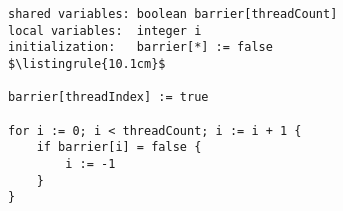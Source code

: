 \begin{minipage}
\centering
\begin{lstlisting}[mathescape, linewidth=10.1cm]
shared variables: boolean barrier[threadCount]
local variables:  integer i
initialization:   barrier[*] := false
$\listingrule{10.1cm}$

barrier[threadIndex] := true

for i := 0; i < threadCount; i := i + 1 {
	if barrier[i] = false {
		i := -1
	}
}
\end{lstlisting}
\end{minipage}
